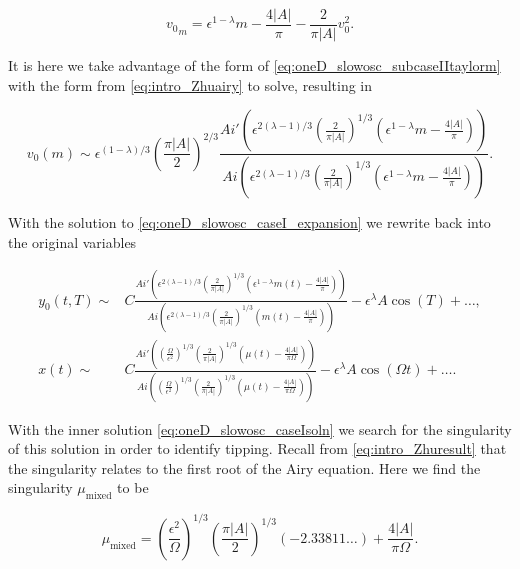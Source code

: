 \begin{equation}\label{eq:oneD_slowosc_subcaseIItaylorm}
{v_0}_m = \epsilon^{1-\lambda}m - \frac{4|A|}{\pi} - \frac{2}{\pi |A|}v_0^2.
\end{equation}

It is here we take advantage of the form of \eqref{eq:oneD_slowosc_subcaseIItaylorm} with the form from \eqref{eq:intro_Zhuairy} to solve, resulting in

\begin{equation*}
v_0(m)\sim \epsilon^{(1-\lambda)/3}\left( \frac{\pi |A|}{2} \right)^{2/3}\frac{Ai'\left(\epsilon^{2(\lambda-1)/3}\left(\frac{2}{\pi |A|}\right)^{1/3}(\epsilon^{1-\lambda}m-\frac{4|A|}{\pi})\right)}{Ai\left(\epsilon^{2(\lambda-1)/3}\left(\frac{2}{\pi |A|}\right)^{1/3}(\epsilon^{1-\lambda}m-\frac{4|A|}{\pi})\right)}.
\end{equation*}

With the solution to \eqref{eq:oneD_slowosc_caseI_expansion} we rewrite back into the original variables

\begin{equation}\label{eq:oneD_slowosc_caseIsoln}
\begin{aligned}
y_0(t,T)\sim& C\frac{Ai'\left(\epsilon^{2(\lambda-1)/3}\left(\frac{2}{\pi |A|}\right)^{1/3}(\epsilon^{1-\lambda}m(t)-\frac{4|A|}{\pi})\right)}{Ai\left(\epsilon^{2(\lambda-1)/3}\left(\frac{2}{\pi |A|}\right)^{1/3}(m(t)-\frac{4|A|}{\pi})\right)}-\epsilon^\lambda A\cos(T)+\ldots,\\
x(t) \sim& C\frac{Ai'\left(\left(\frac{\Omega}{\epsilon^2}\right)^{1/3}\left(\frac{2}{\pi |A|}\right)^{1/3}(\mu(t)-\frac{4|A|}{\pi \Omega})\right)}{Ai\left(\left(\frac{\Omega}{\epsilon^2}\right)^{1/3}\left(\frac{2}{\pi |A|}\right)^{1/3}(\mu(t)-\frac{4|A|}{\pi \Omega})\right)}-\epsilon^\lambda A\cos(\Omega t) +\ldots.
\end{aligned}
\end{equation}

With the inner solution \eqref{eq:oneD_slowosc_caseIsoln} we search for the singularity of this solution in order to identify tipping. Recall from \eqref{eq:intro_Zhuresult} that the singularity relates to the first root of the Airy equation. Here we find the singularity $\mu_{\text{mixed}}$ to be

\begin{equation}\label{eq:oneD_slowosc_uglymu}
\mu_{\text{mixed}}=\left(\frac{\epsilon^2}{\Omega}\right)^{1/3}\left(\frac{\pi |A|}{2}\right)^{1/3}(-2.33811\ldots)+\frac{4|A|}{\pi \Omega}.
\end{equation}

